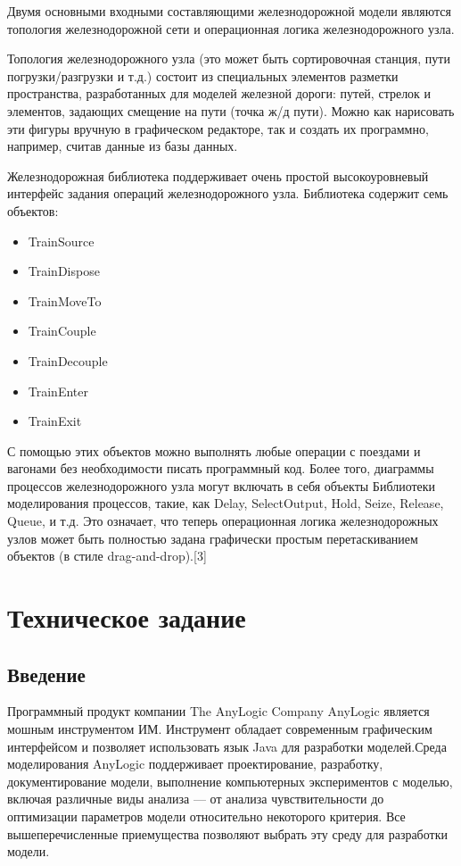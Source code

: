 \documentclass[12pt]{article}
\begin{document}
Двумя основными входными составляющими железнодорожной модели являются топология железнодорожной сети и операционная логика железнодорожного узла.

Топология железнодорожного узла (это может быть сортировочная станция, пути погрузки/разгрузки и т.д.) состоит из специальных элементов разметки пространства, разработанных для моделей железной дороги: путей, стрелок и элементов, задающих смещение на пути (точка ж/д пути). Можно как нарисовать эти фигуры вручную в графическом редакторе, так и создать их программно, например, считав данные из базы данных.

Железнодорожная библиотека поддерживает очень простой высокоуровневый интерфейс задания операций железнодорожного узла. Библиотека содержит семь объектов:

\begin{itemize}
	\item TrainSource 
	\item TrainDispose
	\item TrainMoveTo
	\item TrainCouple 
	\item TrainDecouple
	\item TrainEnter 
	\item TrainExit
\end{itemize}

С помощью этих объектов можно выполнять любые операции с поездами и вагонами без необходимости писать программный код. Более того, диаграммы процессов железнодорожного узла могут включать в себя объекты Библиотеки моделирования процессов, такие, как Delay, SelectOutput, Hold, Seize, Release, Queue, и т.д. Это означает, что теперь операционная логика железнодорожных узлов может быть полностью задана графически простым перетаскиванием объектов (в стиле drag-and-drop).[3]


\newpage
\section{Техническое задание}
	\subsection{Введение }
Программный продукт компании  The AnyLogic Company AnyLogic является мошным инструментом ИМ. Инструмент обладает современным графическим интерфейсом и позволяет использовать язык Java для разработки моделей.Среда моделирования AnyLogic поддерживает проектирование, разработку, документирование модели, выполнение компьютерных экспериментов с моделью, включая различные виды анализа — от анализа чувствительности до оптимизации параметров модели относительно некоторого критерия. Все вышеперечисленные приемущества позволяют выбрать эту среду для разработки модели.
	
\end{document}
